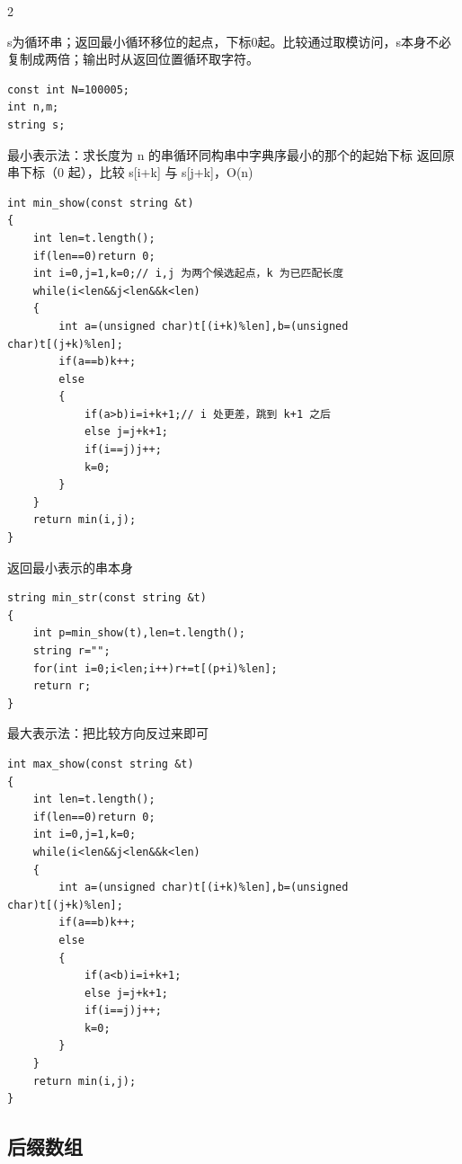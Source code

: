 \documentclass[UTF8,fontset=fandol,a4paper,twoside]{ctexart}
\newcommand{\note}[1]{{\fontsize{10}{12}\selectfont #1\par}}
\begin{document}
\begin{multicols}{2}
\note{s为循环串；返回最小循环移位的起点，下标0起。比较通过取模访问，s本身不必复制成两倍；输出时从返回位置循环取字符。}
\begin{lstlisting}
const int N=100005;
int n,m;
string s;
\end{lstlisting}
\note{最小表示法：求长度为 n 的串循环同构串中字典序最小的那个的起始下标 返回原串下标（0 起），比较 s[\allowbreak{}i+\allowbreak{}k]\allowbreak{} 与 s[\allowbreak{}j+\allowbreak{}k]\allowbreak{}，O(\allowbreak{}n)\allowbreak{}}
\begin{lstlisting}
int min_show(const string &t)
{
    int len=t.length();
    if(len==0)return 0;
    int i=0,j=1,k=0;// i,j 为两个候选起点，k 为已匹配长度
    while(i<len&&j<len&&k<len)
    {
        int a=(unsigned char)t[(i+k)%len],b=(unsigned char)t[(j+k)%len];
        if(a==b)k++;
        else
        {
            if(a>b)i=i+k+1;// i 处更差，跳到 k+1 之后
            else j=j+k+1;
            if(i==j)j++;
            k=0;
        }
    }
    return min(i,j);
}
\end{lstlisting}
\note{返回最小表示的串本身}
\begin{lstlisting}
string min_str(const string &t)
{
    int p=min_show(t),len=t.length();
    string r="";
    for(int i=0;i<len;i++)r+=t[(p+i)%len];
    return r;
}
\end{lstlisting}
\note{最大表示法：把比较方向反过来即可}
\begin{lstlisting}
int max_show(const string &t)
{
    int len=t.length();
    if(len==0)return 0;
    int i=0,j=1,k=0;
    while(i<len&&j<len&&k<len)
    {
        int a=(unsigned char)t[(i+k)%len],b=(unsigned char)t[(j+k)%len];
        if(a==b)k++;
        else
        {
            if(a<b)i=i+k+1;
            else j=j+k+1;
            if(i==j)j++;
            k=0;
        }
    }
    return min(i,j);
}
\end{lstlisting}
\subsection{后缀数组}


\end{multicols}
\end{document}
